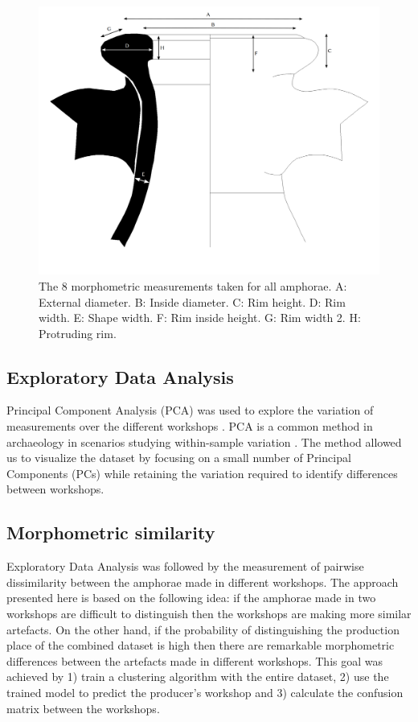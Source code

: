 \documentclass[review]{elsarticle}
\begin{document}
\begin{figure}[htp]
	\centering
\includegraphics[width=\linewidth]{figs/mesures.pdf}
\caption{The 8 morphometric measurements taken for all amphorae. A: External diameter. B: Inside diameter. C: Rim height. D: Rim width. E: Shape width. F: Rim inside height. G: Rim width 2. H: Protruding rim.}
\label{mesures}
\end{figure} 

\subsection{Exploratory Data Analysis}

Principal Component Analysis (PCA) was used to explore the variation of measurements over the different workshops \citep{jolliffe_principal_2002}. PCA is a common method in archaeology in scenarios studying within-sample variation \citep{shennan_quantifying_1997, li_crossbows_2014, schillinger_differences_2016}. The method allowed us to visualize the dataset by focusing on a small number of Principal Components (PCs) while retaining the variation required to identify differences between workshops. 

\subsection{Morphometric similarity} 

Exploratory Data Analysis was followed by the measurement of pairwise dissimilarity between the amphorae made in different workshops. The approach presented here is based on the following idea: if the amphorae made in two workshops are difficult to distinguish then the workshops are making more similar artefacts. On the other hand, if the probability of distinguishing the production place of the combined dataset is high then there are remarkable morphometric differences between the artefacts made in different workshops. This goal was achieved by 1) train a clustering algorithm with the entire dataset, 2) use the trained model to predict the producer's workshop and 3) calculate the confusion matrix between the workshops.
\end{document}
